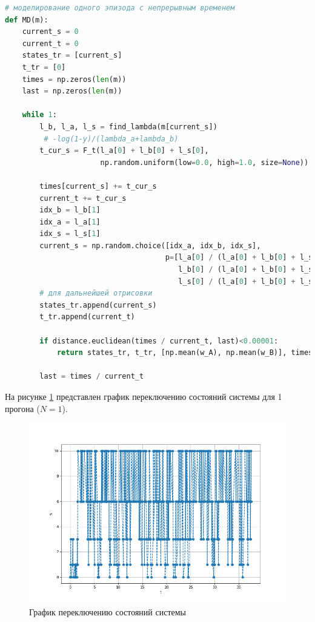 \begin{lstlisting}[language=python, label=prog,caption={\textit{реализация марковского процесса}}]
# моделирование одного эпизода с непрерывным временем
def MD(m):
    current_s = 0
    current_t = 0
    states_tr = [current_s]
    t_tr = [0]
    times = np.zeros(len(m))
    last = np.zeros(len(m))

    while 1:
        l_b, l_a, l_s = find_lambda(m[current_s])
         # -log(1-y)/(lambda_a+lambda_b)
        t_cur_s = F_t(l_a[0] + l_b[0] + l_s[0],
                      np.random.uniform(low=0.0, high=1.0, size=None))

        times[current_s] += t_cur_s
        current_t += t_cur_s
        idx_b = l_b[1]
        idx_a = l_a[1]
        idx_s = l_s[1]
        current_s = np.random.choice([idx_a, idx_b, idx_s],
                                     p=[l_a[0] / (l_a[0] + l_b[0] + l_s[0]),
                                        l_b[0] / (l_a[0] + l_b[0] + l_s[0]),
                                        l_s[0] / (l_a[0] + l_b[0] + l_s[0])])
        # для дальнейшей отрисовки
        states_tr.append(current_s)
        t_tr.append(current_t)

        if distance.euclidean(times / current_t, last)<0.00001:
            return states_tr, t_tr, [np.mean(w_A), np.mean(w_B)], times / current_t, current_t

        last = times / current_t
\end{lstlisting}



На рисунке \ref{MDP} представлен график переключению состояний системы для 1 прогона ($N=1$).
\begin{figure}[H]
\centerline{\includegraphics[width=\textwidth]{Images/term.png}}
\caption{График переключению состояний системы}
\label{MDP}
\end{figure}

